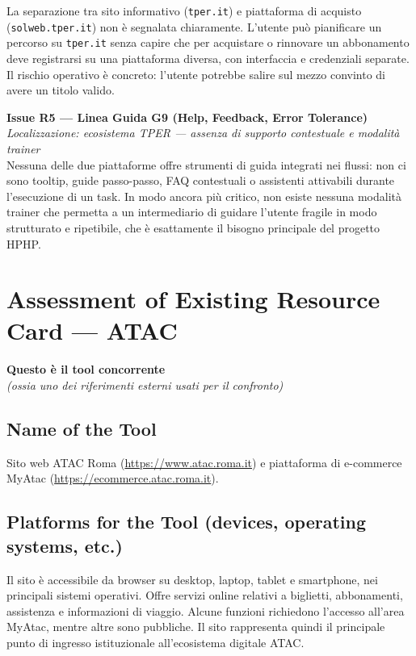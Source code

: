 ﻿\documentclass[11pt,a4paper]{article}
\begin{document}
\noindent La separazione tra sito informativo (\texttt{tper.it}) e
piattaforma di acquisto (\texttt{solweb.tper.it}) non è segnalata
chiaramente. L'utente può pianificare un percorso su \texttt{tper.it}
senza capire che per acquistare o rinnovare un abbonamento deve
registrarsi su una piattaforma diversa, con interfaccia e credenziali
separate. Il rischio operativo è concreto: l'utente potrebbe salire
sul mezzo convinto di avere un titolo valido.

\bigskip

\noindent\textbf{Issue R5 — Linea Guida G9 (Help, Feedback, Error
Tolerance)}\label{iss:H5}\\
\textit{Localizzazione: ecosistema TPER — assenza di supporto
contestuale e modalità trainer}\\

\noindent Nessuna delle due piattaforme offre strumenti di guida
integrati nei flussi: non ci sono tooltip, guide passo-passo, FAQ
contestuali o assistenti attivabili durante l'esecuzione di un task.
In modo ancora più critico, non esiste nessuna modalità trainer che
permetta a un intermediario di guidare l'utente fragile in modo
strutturato e ripetibile, che è esattamente il bisogno principale
del progetto HPHP.

\newpage

\section{Assessment of Existing Resource Card --- ATAC}

\textbf{Questo è il tool concorrente}\\
\textit{(ossia uno dei riferimenti esterni usati per il confronto)}

\subsection*{Name of the Tool}

\noindent Sito web ATAC Roma (\url{https://www.atac.roma.it}) e piattaforma
di e-commerce MyAtac (\url{https://ecommerce.atac.roma.it}).

\subsection*{Platforms for the Tool (devices, operating systems, etc.)}

\noindent Il sito è accessibile da browser su desktop, laptop, tablet e smartphone, nei principali sistemi operativi. Offre servizi online relativi a biglietti, abbonamenti, assistenza e informazioni di viaggio. Alcune funzioni richiedono l’accesso all’area MyAtac, mentre altre sono pubbliche. Il sito rappresenta quindi il principale punto di ingresso istituzionale all’ecosistema digitale ATAC.
\end{document}
